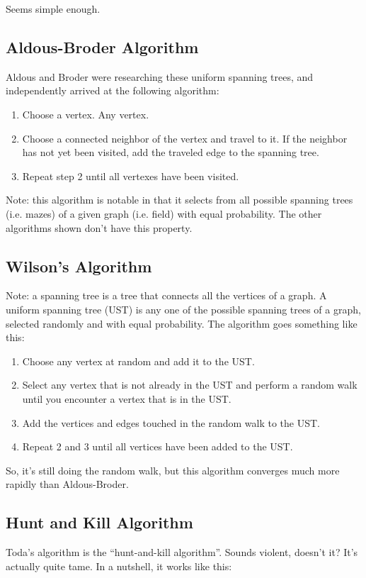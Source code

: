 \documentclass{article}
\begin{document}
{Seems simple enough.

\subsection{Aldous-Broder Algorithm}
Aldous and Broder were researching these uniform spanning trees, and independently arrived at the following algorithm:
\begin{enumerate}
    \item Choose a vertex. Any vertex.
    \item Choose a connected neighbor of the vertex and travel to it. If the neighbor has not yet been visited, add the traveled edge to the spanning tree.
    \item Repeat step 2 until all vertexes have been visited.
\end{enumerate}

Note: this algorithm is notable in that it selects from all possible spanning trees (i.e. mazes) of a given graph (i.e. field) with equal probability. The other algorithms shown don't have this property.

\subsection{Wilson's Algorithm}
Note: a spanning tree is a tree that connects all the vertices of a graph. A uniform spanning tree (UST) is any one of the possible spanning trees of a graph, selected randomly and with equal probability.
The algorithm goes something like this:
\begin{enumerate}
    \item Choose any vertex at random and add it to the UST.
    \item Select any vertex that is not already in the UST and perform a random walk until you encounter a vertex that is in the UST.
    \item Add the vertices and edges touched in the random walk to the UST.
    \item Repeat 2 and 3 until all vertices have been added to the UST.
\end{enumerate}

So, it's still doing the random walk, but this algorithm converges much more rapidly than Aldous-Broder.
\subsection{Hunt and Kill Algorithm}
Toda's algorithm is the “hunt-and-kill algorithm”. Sounds violent, doesn't it? It's actually quite tame. In a nutshell, it works like this:

}
\end{document}
